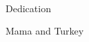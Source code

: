 \thispagestyle{empty}
\renewcommand{\baselinestretch}{2}
\small\normalsize
\hbox{\ }
 
\vspace{-.65in}

\begin{center}
\large{Dedication}
\end{center} 

\vfill
\renewcommand{\baselinestretch}{1}
\small\normalsize

\vspace{-.65in}

\begin{center}
\large{Mama and Turkey}
\end{center}

\vfill

\newpage